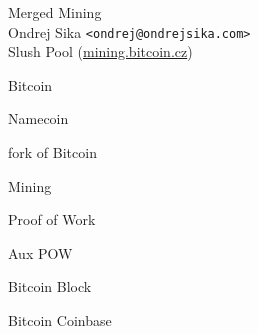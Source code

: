 \documentclass{beamer}
\begin{document}
\Large
\begin{frame}

    {\Huge Merged Mining}\\
    \vspace{7mm}
    {\LARGE Ondrej Sika \lstinline|<ondrej@ondrejsika.com>|}\\
    \vspace{7mm}
    {\Large Slush Pool (\url{mining.bitcoin.cz})}\\

\end{frame}

\begin{frame}

    {\Huge Bitcoin}\\

\end{frame}

\begin{frame}

    {\Huge Namecoin}\\

    \vspace{1cm}

    fork of Bitcoin

\end{frame}

\begin{frame}

    {\Huge Mining}\\

\end{frame}

\begin{frame}

    {\Huge Proof of Work}\\

\end{frame}

\begin{frame}

    {\Huge Aux POW}\\

\end{frame}

\begin{frame}

    {\Huge Bitcoin Block}\\

\end{frame}

\begin{frame}

    {\Huge Bitcoin Coinbase}\\

\end{frame}
\end{document}
